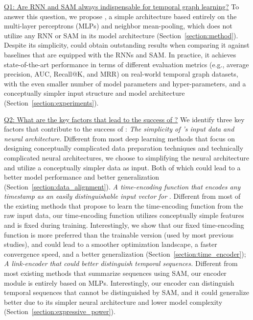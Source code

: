 
\underline{{Q1: Are RNN and SAM always indispensable for temporal graph learning?}}
To answer this question, we propose \oure, a simple architecture based entirely on the multi-layer perceptrons (MLPs) and neighbor mean-pooling, which does not utilize any RNN or SAM in its model architecture (Section~\ref{section:method}).
Despite its simplicity, \our could obtain outstanding results when comparing it against baselines that are equipped with the RNNs and SAM.
In practice, it achieves state-of-the-art performance in terms of different evaluation metrics (e.g., average precision, AUC, Recall@K, and MRR) on real-world temporal graph datasets, with the even smaller number of model parameters and hyper-parameters, and a conceptually simpler input structure and model architecture 
(Section~\ref{section:experiments}).


\underline{{Q2: What are the key factors that lead to the success of \oure?}}
We identify three key factors that contribute to the success of \oure:
 \emph{The simplicity of \oure's input data and neural architecture.}
Different from most deep learning methods that focus on designing conceptually complicated data preparation techniques and technically complicated neural architectures, we choose to simplifying the neural architecture and utilize a conceptually simpler data as input. Both of which could lead to a better model performance and better generalization (Section~\ref{section:data_alignment}).
 \emph{A time-encoding function that encodes any timestamp as an easily distinguishable input vector for \oure}. Different from most of the existing methods that propose to learn the time-encoding function from the raw input data, our time-encoding function utilizes conceptually simple features and is fixed during training. Interestingly, we show that our fixed time-encoding function is more preferred than the trainable version (used by most previous studies), and could lead to a smoother optimization landscape, a faster convergence speed, and a  better generalization (Section~\ref{section:time_encoder});
 \emph{A link-encoder that could better distinguish temporal sequences.}
Different from most existing methods that summarize sequences using SAM, our encoder module is entirely based on MLPs.
Interestingly, our encoder can distinguish temporal sequences that cannot be distinguished by SAM, 
and it could generalize better due to its simpler neural architecture and lower model complexity (Section~\ref{section:expressive_power}).

